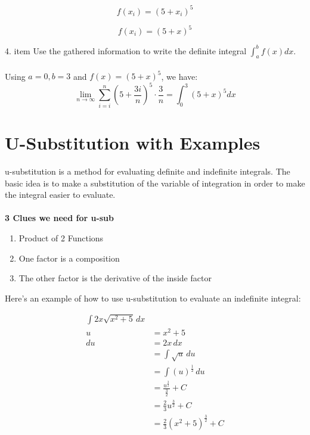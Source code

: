 \begin{framed}
  \begin{equation*}
    f(x_i) = (5+x_i)^5
  \end{equation*}

  \begin{equation*}
    f(x_i) = (5+x)^5
  \end{equation*}

  4. item Use the gathered information to write the definite integral 
        $\int_a^b f(x)dx$.\\\\
  Using $a = 0, b = 3$ and $f(x) = (5+x)^5$, we have:\\
  \begin{equation*}
    \lim_{n \to \infty} \sum_{i=i}^{n} \left(5+\frac{3i}{n}\right)^5\cdot 
    \frac{3}{n} = \int_0^3 (5+x)^5 dx
  \end{equation*}
\end{framed}


\section{U-Substitution with Examples}
u-substitution is a method for evaluating definite and indefinite integrals. 
The basic idea is to make a substitution of the variable of integration in order 
to make the integral easier to evaluate.\\\\
\textbf{3 Clues we need for u-sub}
\begin{enumerate}
  \item Product of 2 Functions
  \item One factor is a composition
  \item The other factor is the derivative of the inside factor
\end{enumerate}

\noindent Here's an example of how to use u-substitution to evaluate an 
indefinite integral:

\begin{framed}
\begin{align*}
  \int 2x \sqrt{x^2+5} \, dx\\
  u &= x^2+5\\
  du &= 2x \, dx\\
  &= \int \sqrt{u} \, du\\
  &= \int (u)^{\frac{1}{2}} \, du\\
  &= \frac{u^{\frac{3}{2}}}{\frac{3}{2}} + C\\
  &= \frac{2}{3} u^{\frac{3}{2}} + C\\
  &= \frac{2}{3} (x^2+5)^{\frac{3}{2}} + C
\end{align*}
\end{framed}


